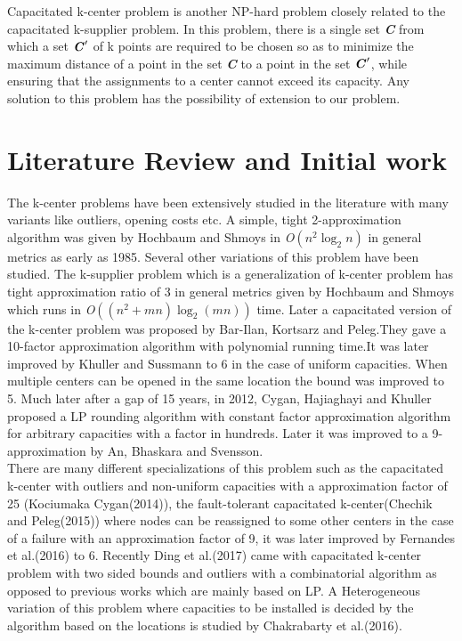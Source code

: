 \documentclass[12pt, a4paper]{article}
\begin{document}
Capacitated k-center problem is another NP-hard problem closely related to the capacitated k-supplier problem. In this problem, there is a single set \textbf{\textit{C}} from which a set $\textbf{\textit{C}}'$ of k points are required to be chosen so as to minimize the maximum distance of a point in the set \textbf{\textit{C}} to a point in the set  $\textbf{\textit{C}}'$, while ensuring that the assignments to a center cannot exceed its capacity. Any solution to this problem has the possibility of extension to our problem.\\

\section{Literature Review and Initial work}
The k-center problems have been extensively studied in the literature with many variants like outliers, opening costs etc. A simple,  tight 2-approximation algorithm was given by Hochbaum and Shmoys\cite{KCBest} in \textit{O}$(n^2 \log_2 n)$ in general metrics as early as 1985. Several other variations of this problem have been studied. The k-supplier problem which is a generalization of k-center problem has tight approximation ratio of 3 in general metrics given by Hochbaum and Shmoys which runs in \textit{O}$((n^2 + mn)\log_2(mn))$ time\cite{KSgen}. Later a capacitated version of the k-center problem was proposed by Bar-Ilan, Kortsarz and Peleg\cite{capKC}.They gave a 10-factor approximation algorithm with polynomial running time.It was later improved by Khuller and Sussmann\cite{capKCimprove} to 6 in the case of uniform capacities. When multiple centers can be opened in the same location the bound was improved to 5. Much later after a gap of 15 years, in 2012, Cygan, Hajiaghayi and Khuller\cite{LPround} proposed a LP rounding algorithm with constant factor approximation algorithm for arbitrary capacities with a factor in hundreds. Later it was improved to a 9-approximation by An, Bhaskara and Svensson\cite{capKCcentrality}.\\

There are many different specializations of this problem such as the capacitated k-center with outliers and non-uniform capacities with a approximation factor of 25 (Kociumaka Cygan\cite{capKCoutliers}(2014)), the fault-tolerant capacitated k-center(Chechik and Peleg\cite{capKCfault}(2015)) where nodes can be reassigned to some other centers in the case of a failure with an approximation factor of 9, it was later improved by Fernandes et al.\cite{capKCtolImp}(2016) to 6. Recently Ding et al.(2017)\cite{capKCbound} came with capacitated k-center problem with two sided bounds and outliers with a combinatorial algorithm as opposed to previous works which are mainly based on LP. A Heterogeneous variation of this problem where capacities to be installed is decided by the algorithm based on the locations is studied by Chakrabarty et al.\cite{capKCloc}(2016).\\
\end{document}
